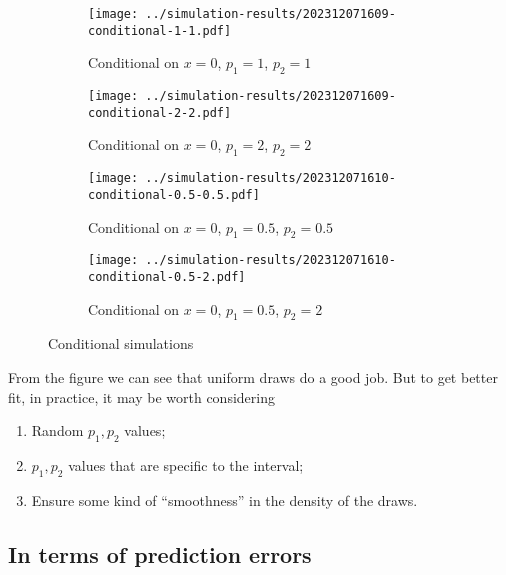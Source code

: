 \documentclass[12pt]{article}
\begin{document}
\begin{figure}[htbp]
    \centering
    \begin{subfigure}{.5\textwidth}
        \centering
        \texttt{[image: ../simulation-results/202312071609-conditional-1-1.pdf]}
        \caption{Conditional on \(x = 0\), \(p_{1} = 1\), \(p_{2} = 1\)}
        \label{fig:sub1}
    \end{subfigure}%
    \begin{subfigure}{.5\textwidth}
        \centering
        \texttt{[image: ../simulation-results/202312071609-conditional-2-2.pdf]}
        \caption{Conditional on \(x = 0\), \(p_{1} = 2\), \(p_{2} = 2\)}
        \label{fig:sub2}
    \end{subfigure}
    \begin{subfigure}{.5\textwidth}
        \centering
        \texttt{[image: ../simulation-results/202312071610-conditional-0.5-0.5.pdf]}
        \caption{Conditional on \(x = 0\), \(p_{1} = 0.5\), \(p_{2} = 0.5\)}
        \label{fig:sub3}
    \end{subfigure}%
    \begin{subfigure}{.5\textwidth}
        \centering
        \texttt{[image: ../simulation-results/202312071610-conditional-0.5-2.pdf]}
        \caption{Conditional on \(x = 0\), \(p_{1} = 0.5\), \(p_{2} = 2\)}
        \label{fig:sub4}
    \end{subfigure}
    \caption{Conditional simulations}
    \label{fig:test}
\end{figure}

From the figure we can see that uniform draws do a good job. But to get better fit, in practice, it may be worth considering
\begin{enumerate}
    \item Random \(p_{1}, p_{2}\) values;
    \item \(p_{1},p_{2}\) values that are specific to the interval;
    \item Ensure some kind of ``smoothness'' in the density of the draws.
\end{enumerate}

\newpage
\subsection{In terms of prediction errors}
\end{document}
